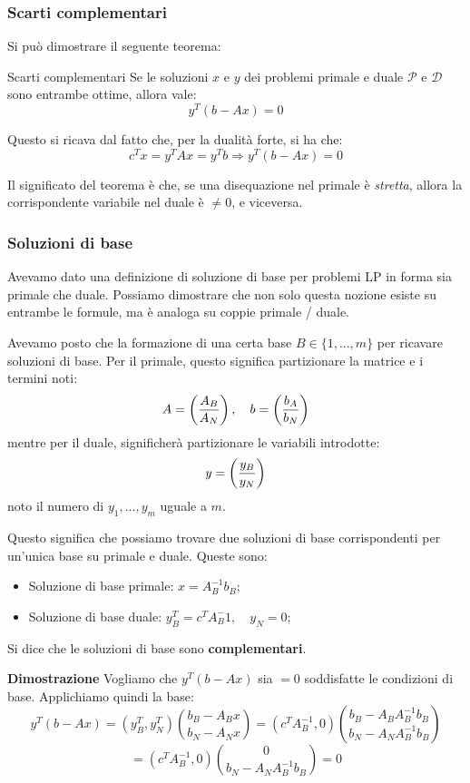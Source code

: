 \documentclass[a4paper,11pt]{article}
\begin{document}
\subsubsection{Scarti complementari}
Si può dimostrare il seguente teorema:
\begin{theorem}{Scarti complementari}
	Se le soluzioni $x$ e $y$ dei problemi primale e duale $\mathcal{P}$ e $\mathcal{D}$ sono entrambe ottime, allora vale:
	$$ y^T (b - Ax) = 0 $$
\end{theorem}
Questo si ricava dal fatto che, per la dualità forte, si ha che:
$$
c^T x = y^T Ax = y^T b \Rightarrow y^T(b - Ax) = 0
$$

Il significato del teorema è che, se una disequazione nel primale è \textit{stretta}, allora la corrispondente variabile nel duale è $\neq 0$, e viceversa.

\subsubsection{Soluzioni di base}
Avevamo dato una definizione di soluzione di base per problemi LP in forma sia primale che duale.
Possiamo dimostrare che non solo questa nozione esiste su entrambe le formule, ma è analoga su coppie primale / duale.

Avevamo posto che la formazione di una certa base $B \in \{ 1, ..., m \}$ per ricavare soluzioni di base.
Per il primale, questo significa partizionare la matrice e i termini noti:
$$
A = \left( A_B \over A_N \right), \quad b = \left( b_A \over b_N \right)
$$
mentre per il duale, significherà partizionare le variabili introdotte:
$$
y = \left( y_B \over y_N \right)
$$
noto il numero di $y_1, ..., y_m$ uguale a $m$.

Questo significa che possiamo trovare due soluzioni di base corrispondenti per un'unica base su primale e duale.
Queste sono:
\begin{itemize}
	\item Soluzione di base primale: $ x = A_B^{-1} b_B $;
	\item Soluzione di base duale: $ y_B^T = c^T A_B^-1, \quad y_N = 0 $;
\end{itemize}
Si dice che le soluzioni di base sono \textbf{complementari}.

\par\smallskip
\noindent 
\textbf{\textsf{Dimostrazione}}
Vogliamo che $y^T(b - Ax)$ sia $=0$ soddisfatte le condizioni di base.
Applichiamo quindi la base:
$$
y^T(b - Ax) = \left( y_B^T, y_N^T \right) \binom{b_B - A_B x}{b_N - A_N x} = \left( c^T A_B^{-1}, 0 \right) \binom{b_B - A_B A_B^{-1} b_B}{b_N - A_N A_B^{-1} b_B}
$$
$$
= \left( c^T A_B^{-1}, 0 \right) \binom{0}{b_N - A_N A_B^{-1} b_B} = 0
$$
\end{document}
